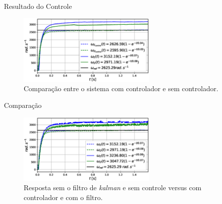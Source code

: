 \begin{frame}{Resultado do Controle}

    \begin{figure}
        \centering
        \includegraphics[width=0.6\textwidth]{figuras/resultados/exp01/controlador_vs_sem_controlador100.eps}
        \caption{Comparação entre o sistema com controlador e sem controlador.}
    \end{figure}
    
\end{frame}

\begin{frame}{Comparação}
    \begin{figure}
        \centering
        \includegraphics[width=0.6\textwidth]{figuras/resultados/exp01/antes_vs_depois100.eps}
        \caption{Resposta sem o filtro de \emph{kalman} e sem controle versus com controlador e com o filtro.}
    \end{figure}
\end{frame}